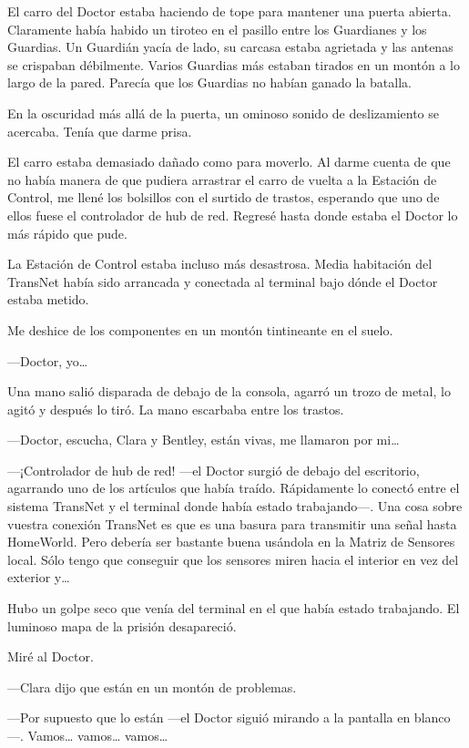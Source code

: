 El carro del Doctor estaba haciendo de tope para mantener una puerta
abierta. Claramente había habido un tiroteo en el pasillo entre los
Guardianes y los Guardias. Un Guardián yacía de lado, su carcasa estaba
agrietada y las antenas se crispaban débilmente. Varios Guardias más
estaban tirados en un montón a lo largo de la pared. Parecía que los
Guardias no habían ganado la batalla.

En la oscuridad más allá de la puerta, un ominoso sonido de
deslizamiento se acercaba. Tenía que darme prisa.

El carro estaba demasiado dañado como para moverlo. Al darme cuenta de
que no había manera de que pudiera arrastrar el carro de vuelta a la
Estación de Control, me llené los bolsillos con el surtido de trastos,
esperando que uno de ellos fuese el controlador de hub de red. Regresé
hasta donde estaba el Doctor lo más rápido que pude.

La Estación de Control estaba incluso más desastrosa. Media habitación
del TransNet había sido arrancada y conectada al terminal bajo dónde el
Doctor estaba metido.

Me deshice de los componentes en un montón tintineante en el suelo.

---Doctor, yo\ldots{}

Una mano salió disparada de debajo de la consola, agarró un trozo de
metal, lo agitó y después lo tiró. La mano escarbaba entre los trastos.

---Doctor, escucha, Clara y Bentley, están vivas, me llamaron por
mi\ldots{}

---¡Controlador de hub de red! ---el Doctor surgió de debajo del
escritorio, agarrando uno de los artículos que había traído. Rápidamente
lo conectó entre el sistema TransNet y el terminal donde había estado
trabajando---. Una cosa sobre vuestra conexión TransNet es que es una
basura para transmitir una señal hasta HomeWorld. Pero debería ser
bastante buena usándola en la Matriz de Sensores local. Sólo tengo que
conseguir que los sensores miren hacia el interior en vez del exterior
y\ldots{}

Hubo un golpe seco que venía del terminal en el que había estado
trabajando. El luminoso mapa de la prisión desapareció.

Miré al Doctor.

---Clara dijo que están en un montón de problemas.

---Por supuesto que lo están ---el Doctor siguió mirando a la pantalla
en blanco---. Vamos\ldots{} vamos\ldots{} vamos\ldots{}

